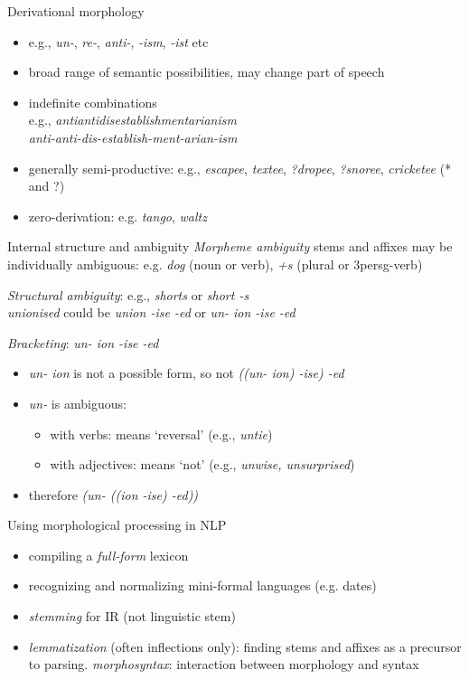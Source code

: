 \documentclass{beamer}
\begin{document}
\begin{frame}{Derivational morphology}
  \begin{itemize}
  \item e.g., {\it un-}, {\it re-}, {\it anti-}, {\it -ism}, {\it -ist} etc
  \item broad range of semantic possibilities, may change part of speech
  \item indefinite combinations\\
    e.g., {\it antiantidisestablishmentarianism}\\
    {\it anti-anti-dis-establish-ment-arian-ism}
  \item generally semi-productive: e.g., {\it escapee}, {\it textee}, {\it ?dropee},
    {\it ?snoree}, {\it *cricketee} (* and ?)
  \item zero-derivation: e.g. {\it tango}, {\it waltz}
  \end{itemize}
\end{frame}

\begin{frame}{Internal structure and ambiguity}
  \emph{Morpheme ambiguity} stems and affixes may be individually
  ambiguous: e.g. {\it dog} (noun or verb), {\it +s} (plural or
  3persg-verb)

  \emph{Structural ambiguity}: e.g., {\it shorts} or {\it short -s}\\
  {\it unionised} could be {\it union -ise -ed} or {\it un- ion -ise
    -ed}

  \emph{Bracketing}: {\it un- ion -ise -ed}

  \begin{itemize}
  \item {\it un- ion} is not a possible form, so not {\it ((un- ion) -ise) -ed}
  \item {\it un-} is ambiguous:
    \begin{itemize}
    \item  with verbs: means `reversal' (e.g., {\it untie})
    \item  with adjectives: means `not' (e.g., {\it unwise, unsurprised})
    \end{itemize}
  \item therefore {\it (un- ((ion -ise) -ed))} 
  \end{itemize}
\end{frame}


\begin{frame}{Using morphological processing in NLP}
  \begin{itemize}
  \item compiling a \emph{full-form} lexicon
  \item recognizing and normalizing mini-formal languages (e.g. dates)
  \item \emph{stemming} for IR (not linguistic stem)
  \item \emph{lemmatization} (often inflections only): finding stems
    and affixes as a precursor to parsing.  \emph{morphosyntax}:
    interaction between morphology and syntax
\end{itemize}
\end{frame}
\end{document}
